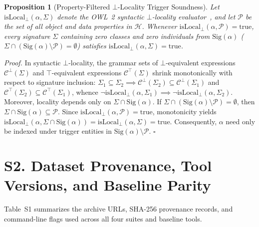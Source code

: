 \documentclass[10pt]{article}
\theoremstyle{accentthm}
\newtheorem{proposition}{Proposition}
\begin{document}
\begin{proposition}[Property-Filtered $\bot$-Locality Trigger Soundness]
\label{prop:locality}
Let $\mathrm{isLocal}_{\bot}(\alpha, \Sigma)$ denote the OWL~2 syntactic $\bot$-locality evaluator~\cite{cuencagrau2008modular}, and let $\mathcal{P}$ be the set of all object and data properties in $\mathcal{H}$. Whenever $\mathrm{isLocal}_{\bot}(\alpha, \mathcal{P}) = \mathrm{true}$, every signature $\Sigma$ containing zero classes and zero individuals from $\mathrm{Sig}(\alpha)$ ($\Sigma \cap (\mathrm{Sig}(\alpha) \setminus \mathcal{P}) = \emptyset$) satisfies $\mathrm{isLocal}_{\bot}(\alpha, \Sigma) = \mathrm{true}$.
\end{proposition}
\textit{Proof.} In syntactic $\bot$-locality, the grammar sets of $\bot$-equivalent expressions $\mathcal{C}^{\bot}(\Sigma)$ and $\top$-equivalent expressions $\mathcal{C}^{\top}(\Sigma)$ shrink monotonically with respect to signature inclusion: $\Sigma_1 \subseteq \Sigma_2 \implies \mathcal{C}^{\bot}(\Sigma_2) \subseteq \mathcal{C}^{\bot}(\Sigma_1)$ and $\mathcal{C}^{\top}(\Sigma_2) \subseteq \mathcal{C}^{\top}(\Sigma_1)$, whence $\neg \mathrm{isLocal}_{\bot}(\alpha, \Sigma_1) \implies \neg \mathrm{isLocal}_{\bot}(\alpha, \Sigma_2)$. Moreover, locality depends only on $\Sigma \cap \mathrm{Sig}(\alpha)$. If $\Sigma \cap (\mathrm{Sig}(\alpha) \setminus \mathcal{P}) = \emptyset$, then $\Sigma \cap \mathrm{Sig}(\alpha) \subseteq \mathcal{P}$. Since $\mathrm{isLocal}_{\bot}(\alpha, \mathcal{P}) = \mathrm{true}$, monotonicity yields $\mathrm{isLocal}_{\bot}(\alpha, \Sigma \cap \mathrm{Sig}(\alpha)) = \mathrm{isLocal}_{\bot}(\alpha, \Sigma) = \mathrm{true}$. Consequently, $\alpha$ need only be indexed under trigger entities in $\mathrm{Sig}(\alpha) \setminus \mathcal{P}$. \hfill $\square$

\section*{S2. Dataset Provenance, Tool Versions, and Baseline Parity}

Table~S1 summarizes the archive URLs, SHA-256 provenance records, and command-line flags used across all four suites and baseline tools.
\end{document}
